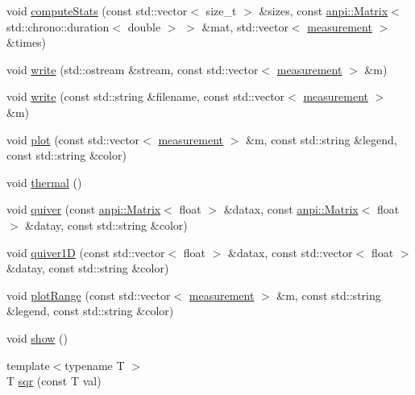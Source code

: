 \begin{DoxyCompactItemize}
\item 
void \hyperlink{namespaceanpi_1_1benchmark_a02a7668535c6dae4644ace1f7f6e2f75}{compute\+Stats} (const std\+::vector$<$ size\+\_\+t $>$ \&sizes, const \hyperlink{classanpi_1_1Matrix}{anpi\+::\+Matrix}$<$ std\+::chrono\+::duration$<$ double $>$ $>$ \&mat, std\+::vector$<$ \hyperlink{structanpi_1_1benchmark_1_1measurement}{measurement} $>$ \&times)
\item 
void \hyperlink{namespaceanpi_1_1benchmark_acbe6f0f44f90b9b7861e08dc1e9231d3}{write} (std\+::ostream \&stream, const std\+::vector$<$ \hyperlink{structanpi_1_1benchmark_1_1measurement}{measurement} $>$ \&m)
\item 
void \hyperlink{namespaceanpi_1_1benchmark_a7ef3ea8c9c9a8b79e1e37df28b3615ce}{write} (const std\+::string \&filename, const std\+::vector$<$ \hyperlink{structanpi_1_1benchmark_1_1measurement}{measurement} $>$ \&m)
\item 
void \hyperlink{namespaceanpi_1_1benchmark_a2342edf4630c65e3bb493d4327aaf2e5}{plot} (const std\+::vector$<$ \hyperlink{structanpi_1_1benchmark_1_1measurement}{measurement} $>$ \&m, const std\+::string \&legend, const std\+::string \&color)
\item 
void \hyperlink{namespaceanpi_1_1benchmark_a9835c451c061a81b48e64c5c055c3768}{thermal} ()
\item 
void \hyperlink{namespaceanpi_1_1benchmark_a7780fd16b79ca29deebddc3494da1886}{quiver} (const \hyperlink{classanpi_1_1Matrix}{anpi\+::\+Matrix}$<$ float $>$ \&datax, const \hyperlink{classanpi_1_1Matrix}{anpi\+::\+Matrix}$<$ float $>$ \&datay, const std\+::string \&color)
\item 
void \hyperlink{namespaceanpi_1_1benchmark_a5595edd07bd29c91ca3b040e2601efb7}{quiver1D} (const std\+::vector$<$ float $>$ \&datax, const std\+::vector$<$ float $>$ \&datay, const std\+::string \&color)
\item 
void \hyperlink{namespaceanpi_1_1benchmark_a58babb1b967728c138790779206a61a1}{plot\+Range} (const std\+::vector$<$ \hyperlink{structanpi_1_1benchmark_1_1measurement}{measurement} $>$ \&m, const std\+::string \&legend, const std\+::string \&color)
\item 
void \hyperlink{namespaceanpi_1_1benchmark_ad790ffd5a54be367b4ffa1fd862f9ba2}{show} ()
\item 
{\footnotesize template$<$typename T $>$ }\\T \hyperlink{namespaceanpi_1_1benchmark_ad4af8012fb125ce95037fbf5e5d003eb}{sqr} (const T val)
\end{DoxyCompactItemize}


